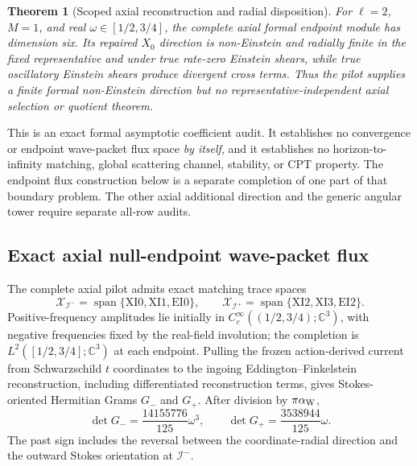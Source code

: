 \documentclass[11pt]{article}
\newtheorem{theorem}{Theorem}[section]
\theoremstyle{definition}
\theoremstyle{remark}
\begin{document}
\begin{theorem}[Scoped axial reconstruction and radial disposition]
For \(\ell=2\), \(M=1\), and real \(\omega\in[1/2,3/4]\), the complete
axial formal endpoint module has dimension six.  Its repaired \(X_0\)
direction is non-Einstein and radially finite in the fixed representative and
under true rate-zero Einstein shears, while true oscillatory Einstein shears
produce divergent cross terms.  Thus the pilot supplies a finite formal
non-Einstein direction but no representative-independent axial selection or
quotient theorem.
\end{theorem}

This is an exact formal asymptotic coefficient audit.  It establishes no
convergence or endpoint wave-packet flux space \emph{by itself}, and it
establishes no horizon-to-infinity matching, global scattering channel,
stability, or CPT property.  The endpoint flux construction below is a
separate completion of one part of that boundary problem.  The other axial
additional direction and the generic angular tower require separate all-row
audits.

\subsection{Exact axial null-endpoint wave-packet flux}

The complete axial pilot admits exact matching trace spaces
\begin{equation}
 \mathcal X_{\mathscr I^-}
 =\operatorname{span}\{\mathrm{XI0},\mathrm{XI1},\mathrm{EI0}\},
 \qquad
 \mathcal X_{\mathscr I^+}
 =\operatorname{span}\{\mathrm{XI2},\mathrm{XI3},\mathrm{EI2}\}.
\end{equation}
Positive-frequency amplitudes lie initially in
\(C_c^\infty((1/2,3/4);\mathbb C^3)\), with negative frequencies fixed by
the real-field involution; the completion is
\(L^2([1/2,3/4];\mathbb C^3)\) at each endpoint.  Pulling the frozen
action-derived current from Schwarzschild \(t\) coordinates to the ingoing
Eddington--Finkelstein reconstruction, including differentiated
reconstruction terms, gives Stokes-oriented Hermitian Grams \(G_-\) and
\(G_+\).  After division by \(\pi\alpha_{\rm W}\),
\begin{equation}
 \det G_-=\frac{14155776}{125}\omega^3,
 \qquad
 \det G_+=\frac{3538944}{125}\omega .
\end{equation}
The past sign includes the reversal between the coordinate-radial direction
and the outward Stokes orientation at \(\mathscr I^-\).
\end{document}
